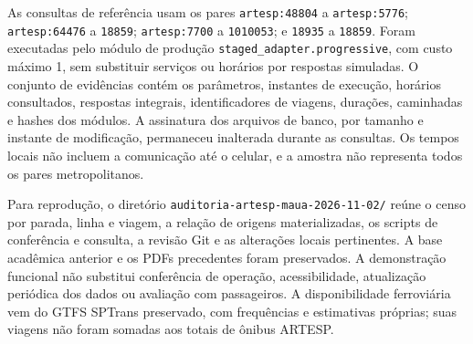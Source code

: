 As consultas de referência usam os pares \nolinkurl{artesp:48804} a \nolinkurl{artesp:5776}; \nolinkurl{artesp:64476} a \texttt{18859}; \nolinkurl{artesp:7700} a \texttt{1010053}; e \texttt{18935} a \texttt{18859}. Foram executadas pelo módulo de produção \nolinkurl{staged_adapter.progressive}, com custo máximo 1, sem substituir serviços ou horários por respostas simuladas. O conjunto de evidências contém os parâmetros, instantes de execução, horários consultados, respostas integrais, identificadores de viagens, durações, caminhadas e hashes dos módulos. A assinatura dos arquivos de banco, por tamanho e instante de modificação, permaneceu inalterada durante as consultas. Os tempos locais não incluem a comunicação até o celular, e a amostra não representa todos os pares metropolitanos.

Para reprodução, o diretório \nolinkurl{auditoria-artesp-maua-2026-11-02/} reúne o censo por parada, linha e viagem, a relação de origens materializadas, os scripts de conferência e consulta, a revisão Git e as alterações locais pertinentes. A base acadêmica anterior e os PDFs precedentes foram preservados. A demonstração funcional não substitui conferência de operação, acessibilidade, atualização periódica dos dados ou avaliação com passageiros. A disponibilidade ferroviária vem do GTFS SPTrans preservado, com frequências e estimativas próprias; suas viagens não foram somadas aos totais de ônibus ARTESP.
